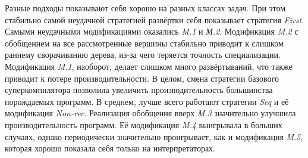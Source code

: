 %


Разные подходы показывают себя хорошо на разных классах задач.
При этом стабильно самой неудачной стратегией развёртки себя
показывает стратегия {\it First}. Самыми неудачными модификациями оказались
{\it M.1} и {\it М.2}.
Модификация \textit{M.2} с обобщением на все рассмотренные вершины стабильно приводит
к слишком раннему сворачиванию дерева, из-за чего теряется точность специализации.
Модификация \textit{M.1}, наоборот, делает слишком много развёртываний, что также
приводит к потере производительности.
В целом, смена стратегии базового суперкомпилятора позволила увеличить
производительность большинства порождаемых программ. В среднем, лучше
всего работают стратегии \textit{Seq} и её модификация \textit{Non-rec}.
Реализация обобщения вверх \textit{M.3} значительно улучшила производительность программ.
Её модификация \textit{M.4} выигрывала в больших случаях, однако периодически
значительно проигрывает, как и модификация \textit{M.5}, которая хорошо показала
себя только на интерпретаторах.

